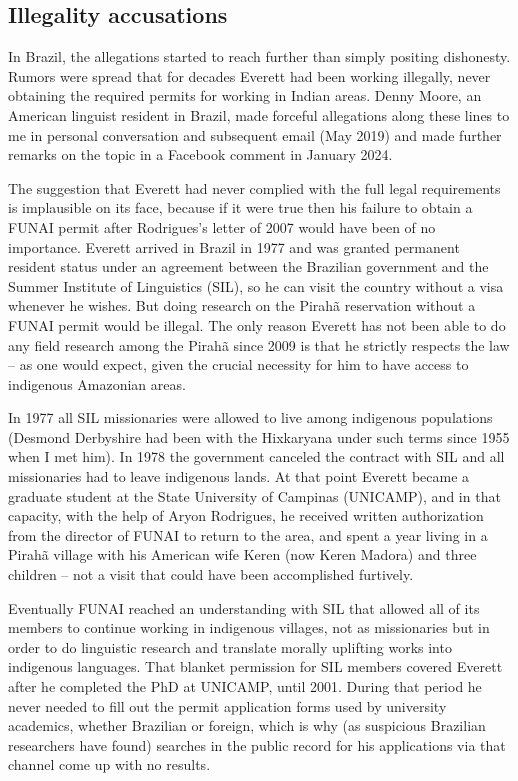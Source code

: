 \documentclass[output=paper,colorlinks,citecolor=brown
]{langscibook}
\begin{document}
\subsection{Illegality accusations}

In Brazil, the allegations started to reach further than simply positing
dishonesty. Rumors were spread that for decades Everett had been working
illegally, never obtaining the required permits for working in
Indian areas. Denny Moore, an American linguist resident in Brazil,
made forceful allegations along these lines to me in personal conversation
and subsequent email (May 2019) and made further remarks on the topic
in a Facebook comment in January 2024.

The suggestion that Everett had never complied with the full legal
requirements is implausible on its face, because if it were true then
his failure to obtain a FUNAI permit after Rodrigues's letter of 2007
would have been of no importance. Everett arrived in Brazil in 1977
and was granted permanent resident status under an agreement between
the Brazilian government and the Summer Institute of Linguistics
(SIL), so he can visit the country without a visa whenever he wishes.
But doing research on the Pirah{\~a} reservation without a FUNAI
permit would be illegal. The only reason Everett has not been able
to do any field research among the Pirah{\~a} since 2009 is that he
strictly respects the law -- as one would expect, given the crucial
necessity for him to have access to indigenous Amazonian areas.

In 1977 all SIL missionaries were allowed to live among indigenous
populations (Desmond Derbyshire had been with the Hixkaryana under
such terms since 1955 when I met him). In 1978 the government canceled
the contract with SIL and all missionaries had to leave indigenous
lands. At that point Everett became a graduate student at the State
University of Campinas (UNICAMP), and in that capacity, with the help
of Aryon Rodrigues, he received written authorization from the director
of FUNAI to return to the area, and spent a year living in a Pirah{\~a}
village with his American wife Keren (now Keren Madora) and three
children -- not a visit that could have been accomplished furtively.

Eventually FUNAI reached an understanding with SIL that allowed all
of its members to continue working in indigenous villages, not as
missionaries but in order to do linguistic research and translate
morally uplifting works into indigenous languages. That blanket
permission for SIL members covered Everett after he completed the PhD
at UNICAMP, until 2001. During that period he never needed to fill
out the permit application forms used by university academics, whether
Brazilian or foreign, which is why (as suspicious Brazilian researchers
have found) searches in the public record for his applications via
that channel come up with no results.
\end{document}
